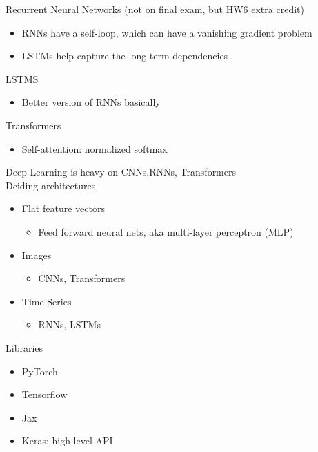 \documentclass[10pt, oneside]{article}
\begin{document}
Recurrent Neural Networks (not on final exam, but HW6 extra credit)
\begin{itemize}
    \item RNNs have a self-loop, which can have a vanishing gradient problem
    \item LSTMs help capture the long-term dependencies
\end{itemize}
LSTMS
\begin{itemize}
    \item Better version of RNNs basically
\end{itemize}
Transformers
\begin{itemize}
    \item Self-attention: normalized softmax
\end{itemize}
Deep Learning is heavy on CNNs,RNNs, Transformers\\
Dciding architectures
\begin{itemize}
    \item Flat feature vectors
    \begin{itemize}
        \item Feed forward neural nets, aka multi-layer perceptron (MLP)
    \end{itemize}
    \item Images
    \begin{itemize}
        \item CNNs, Transformers
    \end{itemize}
    \item Time Series
    \begin{itemize}
        \item RNNs, LSTMs
    \end{itemize}
\end{itemize}
Libraries
\begin{itemize}
    \item PyTorch
    \item Tensorflow
    \item Jax
    \item Keras: high-level API
\end{itemize}
\end{document}
